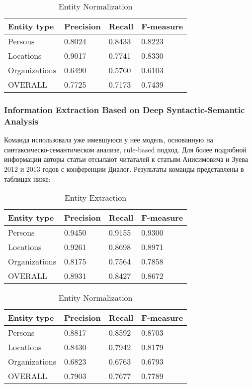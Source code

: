 \begin{table}[ht]
\centering
\caption{Entity Normalization}
\label{factrueval_2_2}
\begin{tabular}{|l|l|l|l|}
\hline
Entity type   & Precision & Recall & F-measure \\ \hline
Persons       & 0.8024    & 0.8433 & 0.8223    \\ \hline
Locations     & 0.9017    & 0.7741 & 0.8330    \\ \hline
Organizations & 0.6490    & 0.5760 & 0.6103    \\ \hline
OVERALL       & 0.7725    & 0.7173 & 0.7439    \\ \hline
\end{tabular}
\end{table}

\subsubsection{Information Extraction Based on Deep Syntactic-Semantic Analysis}

Команда использовала уже имевшуюся у нее модель, основанную на синтаксическо-семантическом анализе, rule-based подход. Для более подробной информации авторы статьи отсылают читаталей к статьям Анисимовича и Зуева 2012 и 2013 годов с конференции Диалог.
Результаты команды представлены в таблицах ниже:


\begin{table}[ht]
\centering
\caption{Entity Extraction}
\label{factrueval_3_1}
\begin{tabular}{|l|l|l|l|}
\hline
Entity type    & Precision      & Recall      & F-measure     \\ \hline
Persons     & 0.9450 & 0.9155 & 0.9300 \\ \hline
Locations     & 0.9261 & 0.8698 & 0.8971 \\ \hline
Organizations     & 0.8175 & 0.7564 & 0.7858 \\ \hline
OVERALL & 0.8931 & 0.8427 & 0.8672 \\ \hline
\end{tabular}
\end{table}

\begin{table}[ht]
\centering
\caption{Entity Normalization}
\label{factrueval_3_2}
\begin{tabular}{|l|l|l|l|}
\hline
Entity type    & Precision      & Recall      & F-measure     \\ \hline
Persons     & 0.8817 & 0.8592 & 0.8703 \\ \hline
Locations     & 0.8430 & 0.7942 & 0.8179 \\ \hline
Organizations     & 0.6823 & 0.6763 & 0.6793 \\ \hline
OVERALL & 0.7903 & 0.7677 & 0.7789 \\ \hline
\end{tabular}
\end{table}